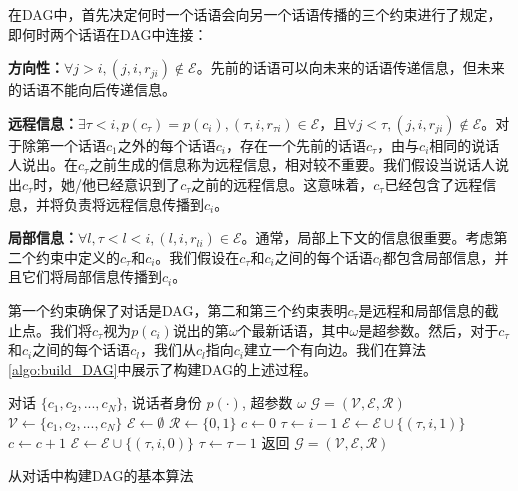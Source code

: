 在DAG中，首先决定何时一个话语会向另一个话语传播的三个约束进行了规定，即何时两个话语在DAG中连接：

\noindent
\textbf{方向性：}$\forall j>i, (j,i,r_{ji})\notin\mathcal{E}$。先前的话语可以向未来的话语传递信息，但未来的话语不能向后传递信息。

\noindent
\textbf{远程信息：}$\exists \tau< i, p(c_\tau)=p(c_i), (\tau,i,r_{\tau i})\in\mathcal{E}$，且$\forall j<\tau,(j,i,r_{ji})\notin\mathcal{E}$。对于除第一个话语$c_1$之外的每个话语$c_i$，存在一个先前的话语$c_\tau$，由与$c_i$相同的说话人说出。在$c_\tau$之前生成的信息称为远程信息，相对较不重要。我们假设当说话人说出$c_\tau$时，她/他已经意识到了$c_\tau$之前的远程信息。这意味着，$c_\tau$已经包含了远程信息，并将负责将远程信息传播到$c_i$。

\noindent
\textbf{局部信息：}$\forall l, \tau<l<i, (l,i,r_{li})\in\mathcal{E}$。通常，局部上下文的信息很重要。考虑第二个约束中定义的$c_\tau$和$c_i$。我们假设在$c_\tau$和$c_i$之间的每个话语$c_l$都包含局部信息，并且它们将局部信息传播到$c_i$。

第一个约束确保了对话是DAG，第二和第三个约束表明$c_\tau$是远程和局部信息的截止点。我们将$c_\tau$视为$p(c_i)$说出的第$\omega$个最新话语，其中$\omega$是超参数。然后，对于$c_\tau$和$c_i$之间的每个话语$c_l$，我们从$c_l$指向$c_i$建立一个有向边。我们在算法\ref{algo:build_DAG}中展示了构建DAG的上述过程。


\begin{algorithm}[t]

\begin{algorithmic}[1]
		\REQUIRE 对话 $\{c_1, c_2, ..., c_N\}$, 说话者身份 $p(\cdot)$, 超参数 $\omega$
		\ENSURE $\mathcal{G} = (\mathcal{V},\mathcal{E},\mathcal{R})$
		\STATE $\mathcal{V} \gets \{c_1, c_2, ..., c_N\}$ 
		\STATE $\mathcal{E} \gets \emptyset$
		\STATE $\mathcal{R} \gets \{0,1\}$ 
		\STATE $c \gets 0$
		\STATE $\tau \gets i-1$
		\STATE $\mathcal{E} \gets \mathcal{E}\cup\{(\tau,i,1)\}$
		\STATE $c \gets c +1$
		\ELSE
		\STATE $\mathcal{E} \gets \mathcal{E}\cup\{(\tau,i,0)\}$
		\ENDIF
		\STATE $\tau \gets \tau-1$
		\ENDWHILE
		\ENDFOR
		\STATE 返回 $\mathcal{G} = (\mathcal{V},\mathcal{E},\mathcal{R})$
	\end{algorithmic}
\vspace{6mm}
\caption{从对话中构建DAG的基本算法}
\label{algo:build_DAG}

\end{algorithm}

